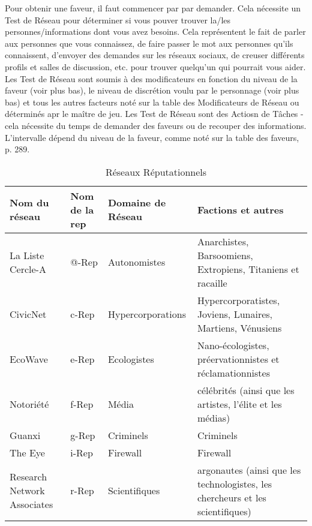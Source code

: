 Pour obtenir une faveur, il faut commencer par par demander. Cela nécessite un Test de Réseau pour déterminer si vous pouver trouver la/les personnes/informations dont vous avez besoins. Cela représentent le fait de parler aux personnes que vous connaissez, de faire passer le mot aux personnes qu'ils connaissent, d'envoyer des demandes sur les réseaux sociaux, de creuser différents profils et salles de discussion, etc. pour trouver quelqu'un qui pourrait vous aider. Les Test de Réseau sont soumis à des modificateurs en fonction du niveau de la faveur (voir plus bas), le niveau de discrétion voulu par le personnage (voir plus bas) et tous les autres facteurs noté sur la table des Modificateurs de Réseau ou déterminés apr le maître de jeu. Les Test de Réseau sont des Actiosn de Tâches - cela nécessite du temps de demander des faveurs ou de recouper des informations. L'intervalle dépend du niveau de la faveur, comme noté sur la table des faveurs, p. 289. 

\begin{table}
   \caption{Réseaux Réputationnels}
   \begin{tabularx}{\textwidth}{|X|l|l|X|} \hline
Nom du réseau &Nom de la rep &Domaine de Réseau &Factions et autres \\ \hline

La Liste Cercle-A &@-Rep &Autonomistes &Anarchistes, Barsoomiens, Extropiens, Titaniens et racaille \\ \hline

CivicNet &c-Rep &Hypercorporations &Hypercorporatistes, Joviens, Lunaires, Martiens, Vénusiens \\ \hline

EcoWave &e-Rep &Ecologistes &Nano-écologistes, préervationnistes et réclamationnistes \\ \hline

Notoriété &f-Rep &Média &célébrités (ainsi que les artistes, l'élite et les médias) \\ \hline

Guanxi &g-Rep &Criminels &Criminels \\ \hline

The Eye &i-Rep &Firewall &Firewall \\ \hline

Research Network Associates &r-Rep &Scientifiques &argonautes (ainsi que les technologistes, les chercheurs et les scientifiques) \\ \hline

   \end{tabularx}
\end{table} 

